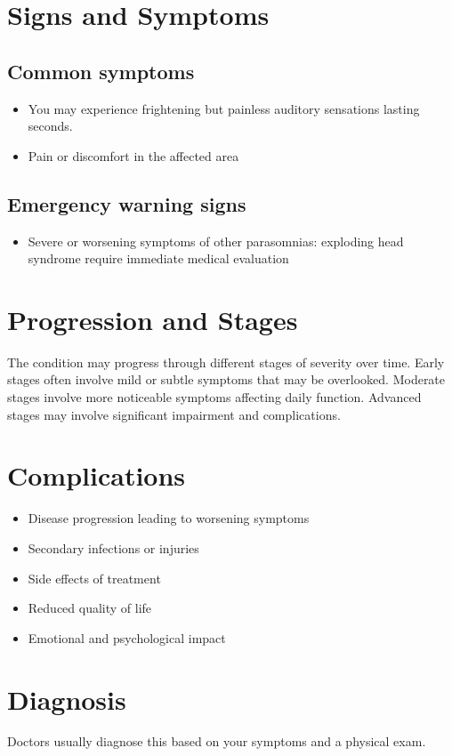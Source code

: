 \section{Signs and Symptoms}

\subsection{Common symptoms}
\begin{itemize}[noitemsep]
  \item You may experience frightening but painless auditory sensations lasting seconds.

  \item Pain or discomfort in the affected area
  \end{itemize}

\subsection{Emergency warning signs}
\begin{itemize}[noitemsep]
  \item Severe or worsening symptoms of other parasomnias: exploding head syndrome require immediate medical evaluation
\end{itemize}
\section{Progression and Stages}
The condition may progress through different stages of severity over time. Early stages often involve mild or subtle symptoms that may be overlooked. Moderate stages involve more noticeable symptoms affecting daily function. Advanced stages may involve significant impairment and complications.
\section{Complications}
\begin{itemize}[noitemsep]
  \item Disease progression leading to worsening symptoms
  \item Secondary infections or injuries
  \item Side effects of treatment
  \item Reduced quality of life
  \item Emotional and psychological impact
\end{itemize}
\section{Diagnosis}
Doctors usually diagnose this based on your symptoms and a physical exam.

